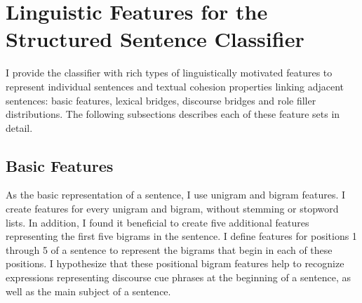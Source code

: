 \section{Linguistic Features for the Structured Sentence Classifier}
\label{features}
I provide the classifier with rich types of linguistically motivated features to represent
individual sentences and textual cohesion properties linking adjacent sentences:
basic features, lexical bridges, discourse bridges and role filler
distributions. The following subsections describes each  of these feature sets in detail.

\subsection{Basic Features}

As the basic representation of a sentence, I use unigram and bigram
features.  I create features for every unigram and bigram, without
stemming or stopword lists.  In addition, I found it beneficial to
create five additional features representing the first five bigrams in
the sentence. I define features for positions 1 through 5 of a
sentence to represent the bigrams that begin in each of these
positions. I hypothesize that these positional bigram features help
to recognize expressions representing discourse cue phrases at the
beginning of a sentence, as well as the main subject of a sentence.




